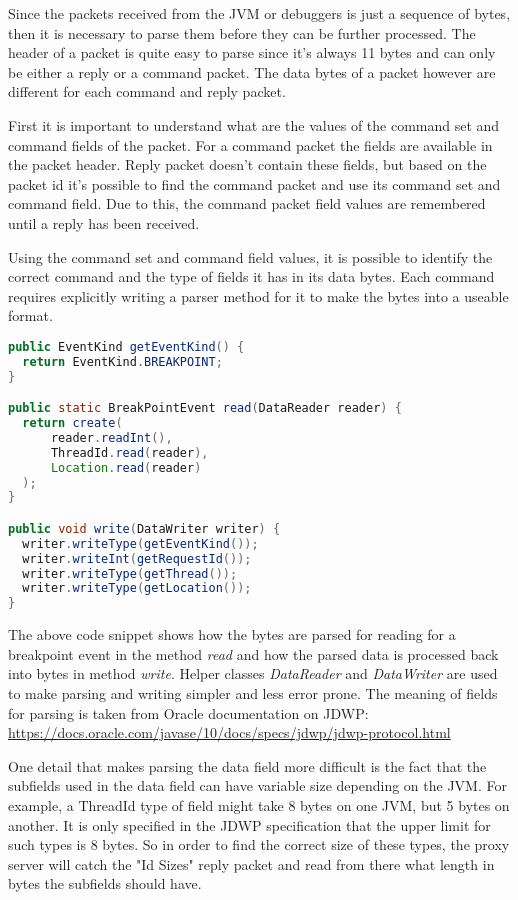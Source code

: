 \documentclass[..thesis.tex]{subfiles}
\begin{document}
Since the packets received from the JVM or debuggers is just a sequence of bytes, then it is necessary to parse them before they can be further processed.
The header of a packet is quite easy to parse since it's always 11 bytes and can only be either a reply or a command packet.
The data bytes of a packet however are different for each command and reply packet.

First it is important to understand what are the values of the command set and command fields of the packet. 
For a command packet the fields are available in the packet header.
Reply packet doesn't contain these fields, but based on the packet id it's possible to find the command packet and use its command set and command field.
Due to this, the command packet field values are remembered until a reply has been received. 

Using the command set and command field values, it is possible to identify the correct command and the type of fields it has in its data bytes.
Each command requires explicitly writing a parser method for it to make the bytes into a useable format.

\begin{lstlisting}[language=java]
public EventKind getEventKind() {
  return EventKind.BREAKPOINT;
}

public static BreakPointEvent read(DataReader reader) {
  return create(
      reader.readInt(),
      ThreadId.read(reader),
      Location.read(reader)
  );
}

public void write(DataWriter writer) {
  writer.writeType(getEventKind());
  writer.writeInt(getRequestId());
  writer.writeType(getThread());
  writer.writeType(getLocation());
}
\end{lstlisting}

The above code snippet shows how the bytes are parsed for reading for a breakpoint event in the method \textit{read} and how the parsed data is processed back into bytes in method \textit{write}.
Helper classes \textit{DataReader} and \textit{DataWriter} are used to make parsing and writing simpler and less error prone.
The meaning of fields for parsing is taken from Oracle documentation on JDWP: \url{https://docs.oracle.com/javase/10/docs/specs/jdwp/jdwp-protocol.html} 

One detail that makes parsing the data field more difficult is the fact that the subfields used in the data field can have variable size depending on the JVM.
For example, a ThreadId type of field might take 8 bytes on one JVM, but 5 bytes on another.
It is only specified in the JDWP specification that the upper limit for such types is 8 bytes.
So in order to find the correct size of these types, the proxy server will catch the "Id Sizes" reply packet and read from there what length in bytes the subfields should have.
\end{document}
